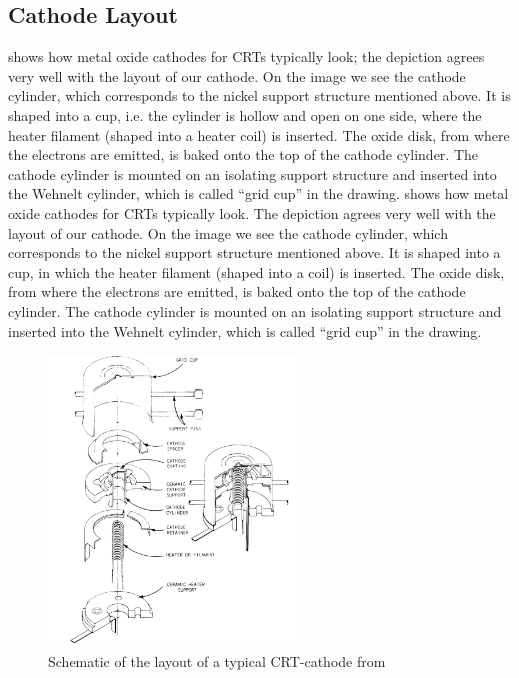 \subsection{Cathode Layout}

 shows how metal oxide cathodes for CRTs typically look; the depiction agrees very well with the layout of our cathode. On the image we see the cathode cylinder, which corresponds to the nickel support structure mentioned above. It is shaped into a cup, i.e. the cylinder is hollow and open on one side, where the heater filament (shaped into a heater coil) is inserted. The oxide disk, from where the electrons are emitted, is baked onto the top of the cathode cylinder. The cathode cylinder is mounted on an isolating support structure and inserted into the Wehnelt cylinder, which is called ``grid cup'' in the drawing. 
 shows how metal oxide cathodes for CRTs typically look. The depiction agrees very well with the layout of our cathode. On the image we see the cathode cylinder, which corresponds to the nickel support structure mentioned above. It is shaped into a cup, in which the heater filament (shaped into a coil) is inserted. The oxide disk, from where the electrons are emitted, is baked onto the top of the cathode cylinder. The cathode cylinder is mounted on an isolating support structure and inserted into the Wehnelt cylinder, which is called ``grid cup'' in the drawing. 
  

\begin{figure}
	\centering
	\includegraphics[width=0.6\textwidth]{Chapters/CRT-Basics/Cathode_layout}
	\caption{Schematic of the layout of a typical CRT-cathode from \cite{deVere69}}
	\label{fig:cathodelayout}
\end{figure}














